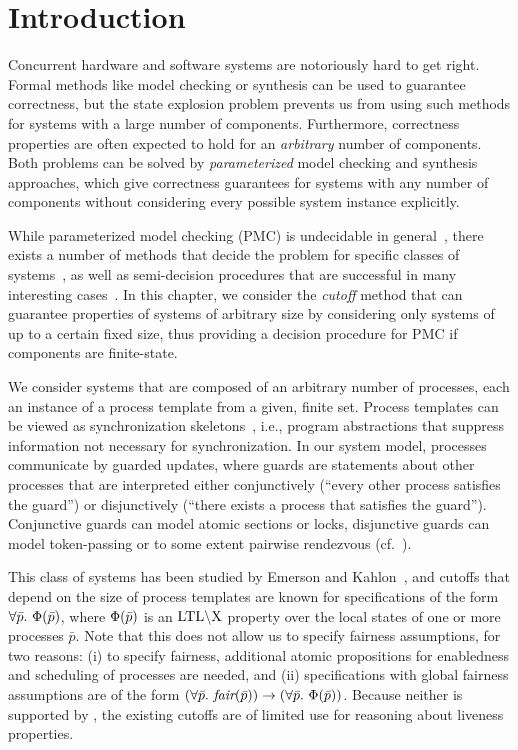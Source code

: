 \section{Introduction}
\label{gua:sec:intro}

Concurrent hardware and software systems are notoriously hard to get right.
Formal methods like model 
checking or synthesis can be used to guarantee correctness, but the state explosion 
problem prevents us from using such methods for systems with a large number 
of components. Furthermore, correctness properties are often expected to hold 
for an \emph{arbitrary} number of components. Both problems can be solved by 
\emph{parameterized} model checking and synthesis approaches, which give correctness 
guarantees for systems with any number of components without considering every 
possible system instance explicitly.

While parameterized model checking (PMC) is undecidable in general~\cite{Suzuki88}, 
there exists a number of methods that decide the problem for specific classes 
of systems~\cite{German92,Emerson00,Emerso03}, as well as semi-decision 
procedures that are successful in many interesting 
cases~\cite{Kurshan95,Clarke08,KaiserKW10}.
In this chapter, we consider the \emph{cutoff} method that can guarantee properties of 
systems of arbitrary size by considering only systems of up to a certain 
fixed size, thus providing a decision procedure for PMC if components are finite-state.

We consider systems that are composed of an arbitrary number of processes,
each an instance of a process template from a given, finite set.  
Process templates can be viewed as synchronization 
skeletons~\cite{EmersonC82}, i.e., program abstractions that suppress information not 
necessary for synchronization. In our system model, processes communicate by guarded updates, 
where guards are statements about other processes that are interpreted either 
conjunctively (``every other process satisfies the guard'') or disjunctively 
(``there exists a process that satisfies the guard''). Conjunctive guards can 
model atomic sections or locks, disjunctive guards can model token-passing or to some extent pairwise rendezvous (cf.~\cite{EmersonK03}). 

This class of systems has been studied by Emerson and 
Kahlon~\cite{Emerson00}, and cutoffs that depend on the 
size of process templates are known for specifications of the form 
$\forall{\bar{p}}.\ \spec(\bar{p})$, 
where $\Phi(\bar{p})$ is an $\text{LTL}\backslash\text{X}$ property over the local states of one or more processes 
$\bar{p}$. Note that this does not allow us to specify fairness 
assumptions, for two reasons: (i) to specify fairness, additional atomic propositions for enabledness and scheduling of processes are needed, and (ii) specifications with global fairness assumptions are of the form 
$(\forall{\bar{p}}.\ \textit{fair}(\bar{p})) \rightarrow (\forall{\bar{p}}.\ \Phi(\bar{p}))$.
Because neither is supported by \cite{Emerson00}, the existing cutoffs are of 
limited use for 
reasoning about liveness properties. 


